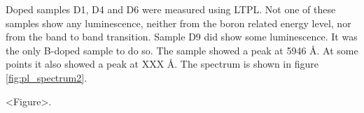 Doped samples D1, D4 and D6 were measured using LTPL. Not one of these samples show any luminescence, neither from the boron related energy level, nor from the band to band transition. Sample D9 did show some luminescence. It was the only B-doped sample to do so. The sample showed a peak at 5946 Å. At some points it also showed a peak at XXX Å. The spectrum is shown in figure \ref{fig:pl_spectrum2}. 

<Figure>.


































